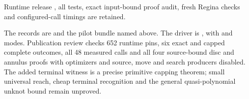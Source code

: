 Runtime release , all tests, exact input-bound proof audit,
fresh Regina checks and configured-call timings are retained.

The records are  and the pilot bundle named
above. The driver is , with
 and  modes. Publication review checks 652 runtime
pins, six exact and capped complete outcomes, all 48 measured calls and all four
source-bound disc and annulus proofs with optimizers and source, move and search producers
disabled. The added terminal witness is a precise primitive capping theorem;
small universal reach, cheap terminal recognition and the general
quasi-polynomial unknot bound remain unproved.
